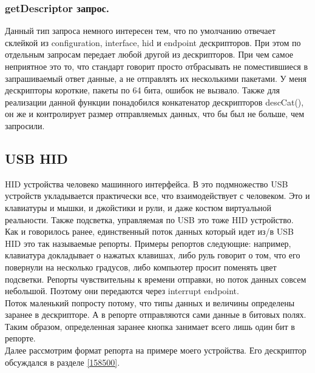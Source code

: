 \documentclass[12pt,a4paper]{article}
\begin{document}
\subsubsection{getDescriptor запрос.}
    Данный тип запроса немного интересен тем, что по умолчанию отвечает
    склейкой из configuration, interface, hid и endpoint дескрипторов. При этом
    по отдельным запросам передает любой другой из дескрипторов.
    При чем самое неприятное это
    то, что стандарт говорит просто отбрасывать не поместившиеся в запрашиваемый
    ответ данные, а не отправлять их несколькими пакетами. У меня дескрипторы
    короткие, пакеты по 64 бита, ошибок не вызвало. Также для реализации данной
    функции понадобился конкатенатор дескрипторов descCat(), он же и
    контролирует размер отправляемых данных, что бы был не больше, чем запросили.

\subsection{USB HID}
    HID устройства человеко машинного интерфейса. В это подмножество USB
    устройств укладывается практически все, что взаимодействует с человеком.
    Это и клавиатуры и мышки, и джойстики и рули, и даже костюм виртуальной
    реальности. Также подсветка, управляемая по USB это тоже HID устройство.\\
    Как и говорилось ранее, единственный поток данных который идет из/в USB HID
    это так называемые репорты. Примеры репортов следующие:
    например, клавиатура докладывает о нажатых клавишах,
    либо руль говорит о том, что его повернули на несколько градусов, либо
    компьютер просит поменять цвет подсветки. Репорты чувствительны к времени
    отправки, но поток данных совсем небольшой. Поэтому они передаются через
    interrupt endpoint.\\
    Поток маленький попросту потому, что типы данных и величины определены
    заранее в дескрипторе. А в репорте отправляются сами данные в битовых
    полях. Таким образом, определенная заранее кнопка занимает всего лишь один
    бит в репорте.\\
    Далее рассмотрим формат репорта на примере моего устройства. Его дескриптор
    обсуждался в разделе \ref{158500}.
\end{document}
